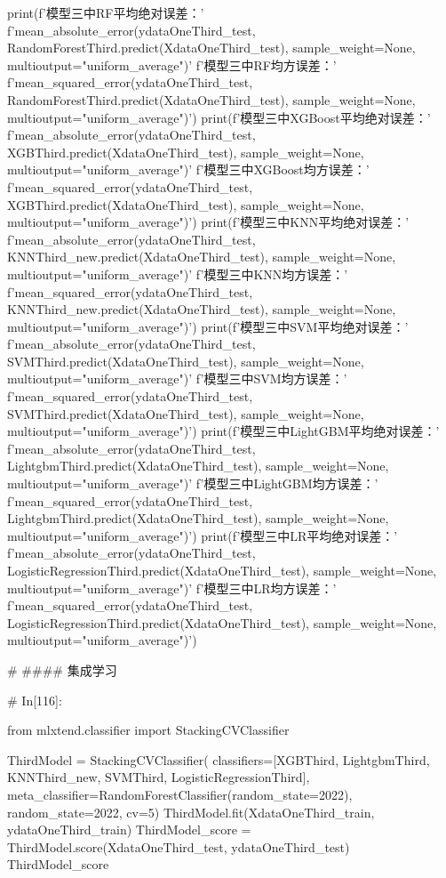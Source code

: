 \documentclass{MathorCupmodeling}
\begin{document}
\begin{python}
	
	print(f'模型三中RF平均绝对误差：'
		  f'{mean_absolute_error(ydataOneThird_test, RandomForestThird.predict(XdataOneThird_test), sample_weight=None, multioutput="uniform_average")}\n'
		  f'模型三中RF均方误差：'
		  f'{mean_squared_error(ydataOneThird_test, RandomForestThird.predict(XdataOneThird_test), sample_weight=None, multioutput="uniform_average")}')
	print(f'模型三中XGBoost平均绝对误差：'
		  f'{mean_absolute_error(ydataOneThird_test, XGBThird.predict(XdataOneThird_test), sample_weight=None, multioutput="uniform_average")}\n'
		  f'模型三中XGBoost均方误差：'
		  f'{mean_squared_error(ydataOneThird_test, XGBThird.predict(XdataOneThird_test), sample_weight=None, multioutput="uniform_average")}')
	print(f'模型三中KNN平均绝对误差：'
		  f'{mean_absolute_error(ydataOneThird_test, KNNThird_new.predict(XdataOneThird_test), sample_weight=None, multioutput="uniform_average")}\n'
		  f'模型三中KNN均方误差：'
		  f'{mean_squared_error(ydataOneThird_test, KNNThird_new.predict(XdataOneThird_test), sample_weight=None, multioutput="uniform_average")}')
	print(f'模型三中SVM平均绝对误差：'
		  f'{mean_absolute_error(ydataOneThird_test, SVMThird.predict(XdataOneThird_test), sample_weight=None, multioutput="uniform_average")}\n'
		  f'模型三中SVM均方误差：'
		  f'{mean_squared_error(ydataOneThird_test, SVMThird.predict(XdataOneThird_test), sample_weight=None, multioutput="uniform_average")}')
	print(f'模型三中LightGBM平均绝对误差：'
		  f'{mean_absolute_error(ydataOneThird_test, LightgbmThird.predict(XdataOneThird_test), sample_weight=None, multioutput="uniform_average")}\n'
		  f'模型三中LightGBM均方误差：'
		  f'{mean_squared_error(ydataOneThird_test, LightgbmThird.predict(XdataOneThird_test), sample_weight=None, multioutput="uniform_average")}')
	print(f'模型三中LR平均绝对误差：'
		  f'{mean_absolute_error(ydataOneThird_test, LogisticRegressionThird.predict(XdataOneThird_test), sample_weight=None, multioutput="uniform_average")}\n'
		  f'模型三中LR均方误差：'
		  f'{mean_squared_error(ydataOneThird_test, LogisticRegressionThird.predict(XdataOneThird_test), sample_weight=None, multioutput="uniform_average")}')
	
	# #### 集成学习
	
	# In[116]:
	
	
	from mlxtend.classifier import StackingCVClassifier
	
	ThirdModel = StackingCVClassifier(
		classifiers=[XGBThird, LightgbmThird, KNNThird_new, SVMThird, LogisticRegressionThird],
		meta_classifier=RandomForestClassifier(random_state=2022), random_state=2022, cv=5)
	ThirdModel.fit(XdataOneThird_train, ydataOneThird_train)
	ThirdModel_score = ThirdModel.score(XdataOneThird_test, ydataOneThird_test)
	ThirdModel_score
	

\end{python}
\end{document}
